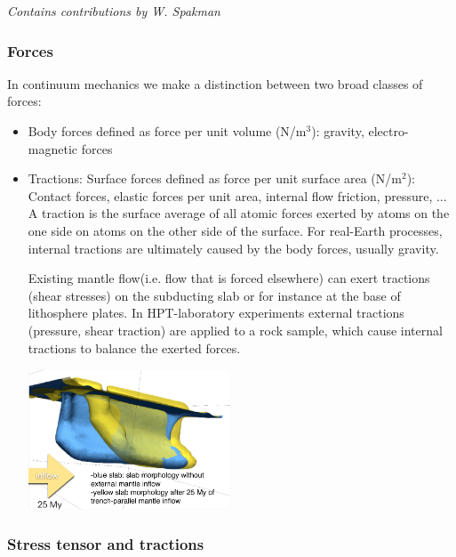 {\sl Contains contributions by W. Spakman} 


\subsubsection{Forces}

In continuum mechanics we make a distinction between two broad classes of forces:
\begin{itemize}
\item Body forces defined as force per unit volume (N/m$^3$): gravity, electro-magnetic forces
\item Tractions: Surface forces defined as force per unit surface area (N/m$^2$):
Contact forces, elastic forces per unit area, internal flow friction, pressure, ...\\
A traction is the surface average of all atomic forces exerted by
atoms on the one side on atoms on the other side of the surface.
For real-Earth processes, internal tractions are ultimately caused by
the body forces, usually gravity.


Existing mantle flow(i.e. flow that is forced elsewhere) can exert
tractions (shear stresses) on the subducting slab or for instance at
the base of lithosphere plates.
In HPT-laboratory experiments external tractions (pressure, shear
traction) are applied to a rock sample, which cause internal
tractions to balance the exerted forces.

\begin{center}
\includegraphics[width=6cm]{images/contmech/spak1}
\end{center}
\end{itemize}

\subsubsection{Stress tensor and tractions}\label{sec:stresstensor}

